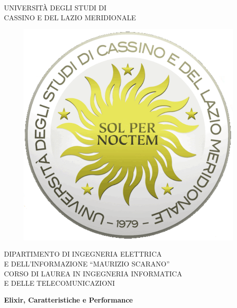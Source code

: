 
\thispagestyle{empty}

\begin{center}
    \Large{UNIVERSITÀ DEGLI STUDI DI \\ CASSINO E DEL LAZIO MERIDIONALE}
\end{center}

\begin{figure}[!htp]
    \centering
    \includegraphics[keepaspectratio=true,scale=0.25]{images/Frontespizio/Unicas_logo.pdf}
\end{figure}

\begin{center}
    \normalsize{DIPARTIMENTO DI INGEGNERIA ELETTRICA \\ E DELL'INFORMAZIONE “MAURIZIO SCARANO”}
    \vspace{4mm}
    \\ \normalsize{CORSO DI LAUREA IN INGEGNERIA INFORMATICA \\ E DELLE TELECOMUNICAZIONI}
\end{center}


\vspace{7mm}


\begin{center}
    \LARGE{\textbf{ Elixir, Caratteristiche e Performance\\ }}
\end{center}



